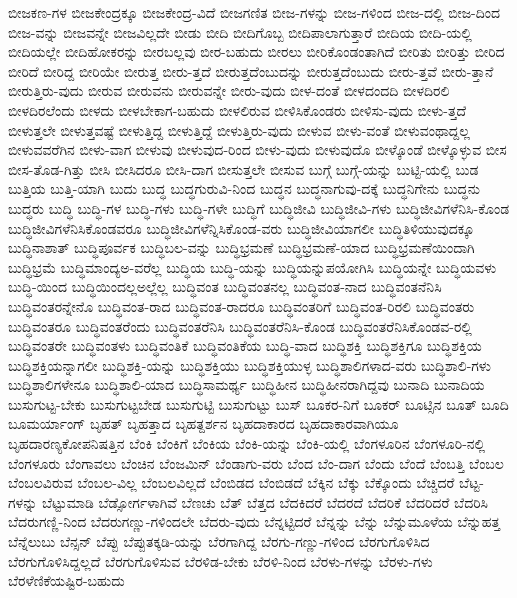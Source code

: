 {ಬೀಜಕಣ-ಗಳ
ಬೀಜಕೇಂದ್ರಕ್ಕೂ
ಬೀಜಕೇಂದ್ರ-ವಿದೆ
ಬೀಜಗಣಿತ
ಬೀಜ-ಗಳನ್ನು
ಬೀಜ-ಗಳಿಂದ
ಬೀಜ-ದಲ್ಲಿ
ಬೀಜ-ದಿಂದ
ಬೀಜ-ವನ್ನು
ಬೀಜವನ್ನೇ
ಬೀಜವಿಲ್ಲದೇ
ಬೀಡು
ಬೀದಿ
ಬೀದಿಗೊಬ್ಬ
ಬೀದಿಪಾಲಾಗುತ್ತಾರೆ
ಬೀದಿಯ
ಬೀದಿ-ಯಲ್ಲಿ
ಬೀದಿಯಲ್ಲೇ
ಬೀದಿಹೋಕರನ್ನು
ಬೀರಬಲ್ಲವು
ಬೀರ-ಬಹುದು
ಬೀರಲು
ಬೀರಿಕೊಂಡಂತಾಗಿದೆ
ಬೀರಿತು
ಬೀರಿತ್ತು
ಬೀರಿದ
ಬೀರಿದೆ
ಬೀರಿದ್ದ
ಬೀರಿಯೇ
ಬೀರುತ್ತ
ಬೀರು-ತ್ತದೆ
ಬೀರುತ್ತದೆಂಬುದನ್ನು
ಬೀರುತ್ತದೆಂಬುದು
ಬೀರು-ತ್ತವೆ
ಬೀರು-ತ್ತಾನೆ
ಬೀರುತ್ತಿರು-ವುದು
ಬೀರುವ
ಬೀರುವನು
ಬೀರುವನ್ನೇ
ಬೀರು-ವುದು
ಬೀಳ-ದಂತೆ
ಬೀಳದಂದದಿ
ಬೀಳದಿರಲಿ
ಬೀಳದಿರಲೆಂದು
ಬೀಳದು
ಬೀಳಬೇಕಾಗ-ಬಹುದು
ಬೀಳಲಿರುವ
ಬೀಳಿಸಿಕೊಂಡರು
ಬೀಳಿಸು-ವುದು
ಬೀಳು-ತ್ತದೆ
ಬೀಳುತ್ತಲೇ
ಬೀಳುತ್ತವಷ್ಟೆ
ಬೀಳುತ್ತಿದ್ದ
ಬೀಳುತ್ತಿದ್ದೆ
ಬೀಳುತ್ತಿರು-ವುದು
ಬೀಳುವ
ಬೀಳು-ವಂತೆ
ಬೀಳುವಂಥಾದ್ದಲ್ಲ
ಬೀಳುವವರೆಗಿನ
ಬೀಳು-ವಾಗ
ಬೀಳುವು
ಬೀಳುವುದ-ರಿಂದ
ಬೀಳು-ವುದು
ಬೀಳುವುದೊ
ಬೀಳ್ಕೊಂಡೆ
ಬೀಳ್ಕೊಳ್ಳುವ
ಬೀಸ
ಬೀಸ-ತೊಡ-ಗಿತ್ತು
ಬೀಸಿ
ಬೀಸಿದರೂ
ಬೀಸಿ-ದಾಗ
ಬೀಸುತ್ತಲೇ
ಬೀಸುವ
ಬುಗ್ಗೆ
ಬುಗ್ಗೆ-ಯನ್ನು
ಬುಟ್ಟಿ-ಯಲ್ಲಿ
ಬುಡ
ಬುತ್ತಿಯ
ಬುತ್ತಿ-ಯಾಗಿ
ಬುದು
ಬುದ್ಧ
ಬುದ್ಧಗುರುವಿ-ನಿಂದ
ಬುದ್ಧನ
ಬುದ್ಧನಾಗುವು-ದಕ್ಕೆ
ಬುದ್ಧನಿಗೇನು
ಬುದ್ಧನು
ಬುದ್ಧರು
ಬುದ್ಧಿ
ಬುದ್ಧಿ-ಗಳ
ಬುದ್ಧಿ-ಗಳು
ಬುದ್ಧಿ-ಗಳೇ
ಬುದ್ಧಿಗೆ
ಬುದ್ಧಿಜೀವಿ
ಬುದ್ಧಿಜೀವಿ-ಗಳು
ಬುದ್ಧಿಜೀವಿಗಳೆನಿಸಿ-ಕೊಂಡ
ಬುದ್ಧಿಜೀವಿಗಳೆನಿಸಿಕೊಂಡವರೂ
ಬುದ್ಧಿಜೀವಿಗಳೆನ್ನಿಸಿಕೊಂಡ-ವರು
ಬುದ್ಧಿಜೀವಿಯಾಗಲೀ
ಬುದ್ಧಿತಿಳಿಯುವುದಕ್ಕೂ
ಬುದ್ಧಿನಾಶಾತ್
ಬುದ್ಧಿಪೂರ್ವಕ
ಬುದ್ಧಿಬಲ-ವನ್ನು
ಬುದ್ಧಿಭ್ರಮಣೆ
ಬುದ್ಧಿಭ್ರಮಣೆ-ಯಾದ
ಬುದ್ಧಿಭ್ರಮಣೆಯಿಂದಾಗಿ
ಬುದ್ಧಿಭ್ರಮೆ
ಬುದ್ಧಿಮಾಂದ್ಯಅ-ವರೆಲ್ಲ
ಬುದ್ಧಿಯ
ಬುದ್ಧಿ-ಯನ್ನು
ಬುದ್ಧಿಯನ್ನುಪಯೋಗಿಸಿ
ಬುದ್ಧಿಯನ್ನೇ
ಬುದ್ಧಿಯವಳು
ಬುದ್ಧಿ-ಯಿಂದ
ಬುದ್ಧಿಯಿಂದಲ್ಲಅಲ್ಲೆಲ್ಲ
ಬುದ್ಧಿವಂತ
ಬುದ್ಧಿವಂತನಲ್ಲ
ಬುದ್ಧಿವಂತ-ನಾದ
ಬುದ್ಧಿವಂತನೆನಿಸಿ
ಬುದ್ಧಿವಂತರನ್ನೇನೊ
ಬುದ್ಧಿವಂತ-ರಾದ
ಬುದ್ಧಿವಂತ-ರಾದರೂ
ಬುದ್ಧಿವಂತರಿಗೆ
ಬುದ್ಧಿವಂತ-ರಿರಲಿ
ಬುದ್ಧಿವಂತರು
ಬುದ್ಧಿವಂತರೂ
ಬುದ್ಧಿವಂತರೆಂದು
ಬುದ್ಧಿವಂತರೆನಿಸಿ
ಬುದ್ಧಿವಂತರೆನಿಸಿ-ಕೊಂಡ
ಬುದ್ಧಿವಂತರೆನಿಸಿಕೊಂಡವ-ರಲ್ಲಿ
ಬುದ್ಧಿವಂತರೇ
ಬುದ್ಧಿವಂತಳು
ಬುದ್ಧಿವಂತಿಕೆ
ಬುದ್ಧಿವಂತಿಕೆಯ
ಬುದ್ಧಿ-ವಾದ
ಬುದ್ಧಿಶಕ್ತಿ
ಬುದ್ಧಿಶಕ್ತಿಗೂ
ಬುದ್ಧಿಶಕ್ತಿಯ
ಬುದ್ಧಿಶಕ್ತಿಯನ್ನಾಗಲೀ
ಬುದ್ಧಿಶಕ್ತಿ-ಯನ್ನು
ಬುದ್ಧಿಶಕ್ತಿಯು
ಬುದ್ಧಿಶಕ್ತಿಯುಳ್ಳ
ಬುದ್ಧಿಶಾಲಿಗಳಾದ-ವರು
ಬುದ್ಧಿಶಾಲಿ-ಗಳು
ಬುದ್ಧಿಶಾಲಿಗಳೇನೂ
ಬುದ್ಧಿಶಾಲಿ-ಯಾದ
ಬುದ್ಧಿಸಾಮರ್ಥ್ಯ
ಬುದ್ಧಿಹೀನ
ಬುದ್ಧಿಹೀನರಾಗಿದ್ದವು
ಬುನಾದಿ
ಬುನಾದಿಯ
ಬುಸುಗುಟ್ಟ-ಬೇಕು
ಬುಸುಗುಟ್ಟಬೇಡ
ಬುಸುಗುಟ್ಟಿ
ಬುಸುಗುಟ್ಟು
ಬುಸ್
ಬೂಕರ-ನಿಗೆ
ಬೂಕರ್
ಬೂಟ್ಸಿನ
ಬೂತ್
ಬೂದಿ
ಬೂಮರ್ಯಾಂಗ್
ಬೃಹತ್
ಬೃಹತ್ತಾದ
ಬೃಹತ್ದರ್ಶನ
ಬೃಹದಾಕಾರದ
ಬೃಹದಾಕಾರವಾಗಿಯೂ
ಬೃಹದಾರಣ್ಯಕೋಪನಿಷತ್ತಿನ
ಬೆಂಕಿ
ಬೆಂಕಿಗೆ
ಬೆಂಕಿಯ
ಬೆಂಕಿ-ಯನ್ನು
ಬೆಂಕಿ-ಯಲ್ಲಿ
ಬೆಂಗಳೂರಿನ
ಬೆಂಗಳೂರಿ-ನಲ್ಲಿ
ಬೆಂಗಳೂರು
ಬೆಂಗಾವಲು
ಬೆಂಚಿನ
ಬೆಂಜಮಿನ್
ಬೆಂಡಾಗು-ವರು
ಬೆಂದ
ಬೆಂ-ದಾಗ
ಬೆಂದು
ಬೆಂದೆ
ಬೆಂಬತ್ತಿ
ಬೆಂಬಲ
ಬೆಂಬಲವಿರುವ
ಬೆಂಬಲ-ವಿಲ್ಲ
ಬೆಂಬಲವಿಲ್ಲದೆ
ಬೆಂಬಿಡದ
ಬೆಂಬಿಡದೆ
ಬೆಕ್ಕಿನ
ಬೆಕ್ಕು
ಬೆಕ್ಕೊಂದು
ಬೆಚ್ಚಿದರೆ
ಬೆಟ್ಟ-ಗಳನ್ನು
ಬೆಟ್ಟುಮಾಡಿ
ಬೆಡ್ಸೋರ್ಗಳಾಗಿವೆ
ಬೆಣಚು
ಬೆತ್
ಬೆತ್ತದ
ಬೆದಕಿದರೆ
ಬೆದರದೆ
ಬೆದರಿಕೆ
ಬೆದರಿದರೆ
ಬೆದರಿಸಿ
ಬೆದರುಗಣ್ಣಿ-ನಿಂದ
ಬೆದರುಗಣ್ಣು-ಗಳಿಂದಲೇ
ಬೆದರು-ವುದು
ಬೆನ್ನಟ್ಟಿದರೆ
ಬೆನ್ನನ್ನು
ಬೆನ್ನು
ಬೆನ್ನುಮೂಳೆಯ
ಬೆನ್ನುಹತ್ತ
ಬೆನ್ನೆಲುಬು
ಬೆನ್ಸನ್
ಬೆಪ್ಪು
ಬೆಪ್ಪುತಕ್ಕಡಿ-ಯನ್ನು
ಬೆರಗಾಗಿದ್ದ
ಬೆರಗು-ಗಣ್ಣು-ಗಳಿಂದ
ಬೆರಗುಗೊಳಿಸಿದ
ಬೆರಗುಗೊಳಿಸಿದ್ದಲ್ಲದೆ
ಬೆರಗುಗೊಳಿಸುವ
ಬೆರಳಿಡ-ಬೇಕು
ಬೆರಳಿ-ನಿಂದ
ಬೆರಳು-ಗಳನ್ನು
ಬೆರಳು-ಗಳು
ಬೆರಳೆಣಿಕೆಯಷ್ಟಿರ-ಬಹುದು
}
